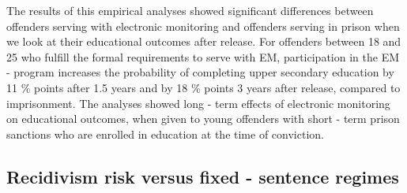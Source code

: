 \documentclass[a4paper,12pt]{article}
\begin{document}
The results of this empirical analyses showed significant differences between offenders serving with electronic monitoring and offenders serving in prison when we look at their educational outcomes after release. For offenders between 18 and 25 who fulfill the formal requirements to serve with EM, participation in the EM - program increases the probability  of completing upper secondary education by 11 \% points after 1.5 years and by 18 \% points 3 years after release, compared to imprisonment. The analyses showed long - term effects of electronic monitoring on educational outcomes, when given to young offenders with short - term prison sanctions who are enrolled in education at the time of conviction. 




\subsection{Recidivism risk versus fixed - sentence regimes}
\end{document}
